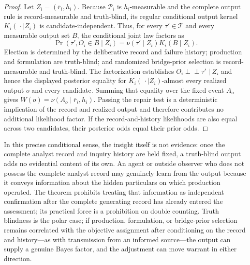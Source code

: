 \documentclass[11pt]{article}
\theoremstyle{definition}
\begin{document}
\begin{proof}
Let $Z_i=(\bar r_i,h_i)$.
Because $\mathcal P_i$ is $h_i$-measurable and the complete output rule is record-measurable and truth-blind, its regular conditional output kernel $K_i(\,\cdot\mid Z_i)$ is candidate-independent.
Thus, for every $\tau'\in\mathcal T$ and every measurable output set $B$, the conditional joint law factors as
\[
\Pr(\tau',O_i\in B\mid Z_i)
=
\nu(\tau'\mid Z_i)K_i(B\mid Z_i).
\]
Election is determined by the deliberative record and failure history; production and formulation are truth-blind; and randomized bridge-prior selection is record-measurable and truth-blind.
The factorization establishes $O_i\perp\!\!\!\perp\tau'\mid Z_i$ and hence the displayed posterior equality for $K_i(\,\cdot\mid Z_i)$-almost every realized output $o$ and every candidate.
Summing that equality over the fixed event $A_o$ gives $W(o)=\nu(A_o\mid\bar r_i,h_i)$.
Passing the repair test is a deterministic implication of the record and realized output and therefore contributes no additional likelihood factor.
If the record-and-history likelihoods are also equal across two candidates, their posterior odds equal their prior odds.
\end{proof}

In this precise conditional sense, the insight itself is not evidence: once the complete analyst record and inquiry history are held fixed, a truth-blind output adds no evidential content of its own.
An agent or outside observer who does not possess the complete analyst record may genuinely learn from the output because it conveys information about the hidden particulars on which production operated.
The theorem prohibits treating that information as independent confirmation after the complete generating record has already entered the assessment; its practical force is a prohibition on double counting.
Truth blindness is the polar case; if production, formulation, or bridge-prior selection remains correlated with the objective assignment after conditioning on the record and history---as with transmission from an informed source---the output can supply a genuine Bayes factor, and the adjustment can move warrant in either direction.
\end{document}
